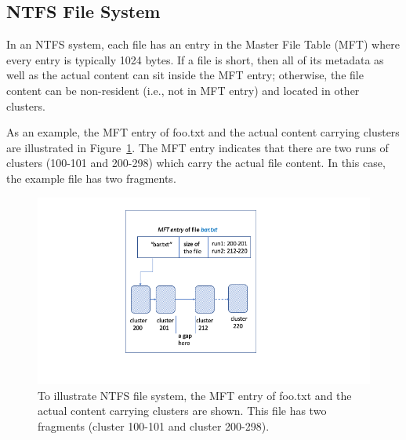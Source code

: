 \subsection{NTFS File System}
\begin{paraphrase}

In an NTFS system, each file has an entry in the Master File Table (MFT) where every entry is typically 1024 bytes. 
If a file is short, then all of its metadata as well as the actual content can sit inside the MFT entry; otherwise, 
the file content can be non-resident (i.e., not in MFT entry) and located in other clusters.
  
As an example, the MFT entry of foo.txt and the actual content carrying clusters are illustrated in Figure~\ref{fig:ntfs}.
The MFT entry indicates that there are two runs of clusters (100-101 and 200-298) which carry the actual file content. 
In this case, the example file has two fragments.

 \begin{figure}[h]
     \centering
     \includegraphics[width=\linewidth]{fig/ntfs.png}
     \caption{To illustrate NTFS file system, the MFT entry of foo.txt and the actual content carrying clusters are shown. 
 This file has two fragments (cluster 100-101 and cluster 200-298).}
     \label{fig:ntfs}
 \end{figure}
 
\end{paraphrase}

